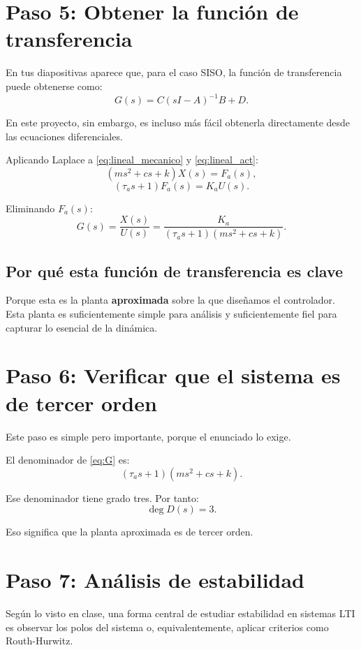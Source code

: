 \documentclass[11pt]{article}
\begin{document}
\section{Paso 5: Obtener la funci\'on de transferencia}

En tus diapositivas aparece que, para el caso SISO, la funci\'on de transferencia puede obtenerse como:
\[
G(s)=C(sI-A)^{-1}B + D.
\]

En este proyecto, sin embargo, es incluso m\'as f\'acil obtenerla directamente desde las ecuaciones diferenciales.

Aplicando Laplace a \eqref{eq:lineal_mecanico} y \eqref{eq:lineal_act}:
\[
(ms^2+cs+k)X(s)=F_a(s),
\]
\[
(\tau_as+1)F_a(s)=K_aU(s).
\]

Eliminando $F_a(s)$:
\begin{equation}
G(s)=\frac{X(s)}{U(s)}
=
\frac{K_a}{(\tau_as+1)(ms^2+cs+k)}.
\label{eq:G}
\end{equation}

\subsection{Por qu\'e esta funci\'on de transferencia es clave}

Porque esta es la planta \textbf{aproximada} sobre la que dise\~namos el controlador. Esta planta es suficientemente simple para an\'alisis y suficientemente fiel para capturar lo esencial de la din\'amica.

\section{Paso 6: Verificar que el sistema es de tercer orden}

Este paso es simple pero importante, porque el enunciado lo exige.

El denominador de \eqref{eq:G} es:
\[
(\tau_as+1)(ms^2+cs+k).
\]

Ese denominador tiene grado tres. Por tanto:
\[
\deg D(s)=3.
\]

Eso significa que la planta aproximada es de tercer orden.

\section{Paso 7: An\'alisis de estabilidad}

Seg\'un lo visto en clase, una forma central de estudiar estabilidad en sistemas LTI es observar los polos del sistema o, equivalentemente, aplicar criterios como Routh-Hurwitz.
\end{document}
